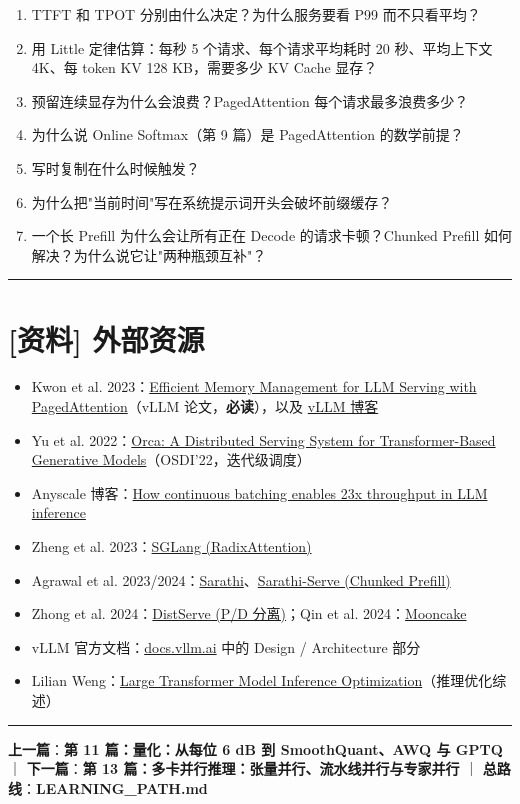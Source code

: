 \begin{enumerate}
  \item TTFT 和 TPOT 分别由什么决定？为什么服务要看 P99 而不只看平均？
  \item 用 Little 定律估算：每秒 5 个请求、每个请求平均耗时 20 秒、平均上下文 4K、每 token KV 128 KB，需要多少 KV Cache 显存？
  \item 预留连续显存为什么会浪费？PagedAttention 每个请求最多浪费多少？
  \item 为什么说 Online Softmax（第 9 篇）是 PagedAttention 的数学前提？
  \item 写时复制在什么时候触发？
  \item 为什么把"当前时间"写在系统提示词开头会破坏前缀缓存？
  \item 一个长 Prefill 为什么会让所有正在 Decode 的请求卡顿？Chunked Prefill 如何解决？为什么说它让"两种瓶颈互补"？
\end{enumerate}

\vspace{0.8em}\hrule\vspace{0.8em}

\section{[资料] 外部资源}

\begin{itemize}
  \item Kwon et al. 2023：\href{https://arxiv.org/abs/2309.06180}{Efficient Memory Management for LLM Serving with PagedAttention}（vLLM 论文，\textbf{必读}），以及 \href{https://blog.vllm.ai/2023/06/20/vllm.html}{vLLM 博客}
  \item Yu et al. 2022：\href{https://www.usenix.org/conference/osdi22/presentation/yu}{Orca: A Distributed Serving System for Transformer-Based Generative Models}（OSDI'22，迭代级调度）
  \item Anyscale 博客：\href{https://www.anyscale.com/blog/continuous-batching-llm-inference}{How continuous batching enables 23x throughput in LLM inference}
  \item Zheng et al. 2023：\href{https://arxiv.org/abs/2312.07104}{SGLang (RadixAttention)}
  \item Agrawal et al. 2023/2024：\href{https://arxiv.org/abs/2308.16369}{Sarathi}、\href{https://arxiv.org/abs/2403.02310}{Sarathi-Serve (Chunked Prefill)}
  \item Zhong et al. 2024：\href{https://arxiv.org/abs/2401.09670}{DistServe (P/D 分离)}；Qin et al. 2024：\href{https://arxiv.org/abs/2407.00079}{Mooncake}
  \item vLLM 官方文档：\href{https://docs.vllm.ai/}{docs.vllm.ai} 中的 Design / Architecture 部分
  \item Lilian Weng：\href{https://lilianweng.github.io/posts/2023-01-10-inference-optimization/}{Large Transformer Model Inference Optimization}（推理优化综述）
\end{itemize}

\vspace{0.8em}\hrule\vspace{0.8em}

\textbf{上一篇}：\textbf{第 11 篇：量化：从每位 6 dB 到 SmoothQuant、AWQ 与 GPTQ} ｜ \textbf{下一篇}：\textbf{第 13 篇：多卡并行推理：张量并行、流水线并行与专家并行} ｜ \textbf{总路线}：\textbf{LEARNING\_PATH.md}
